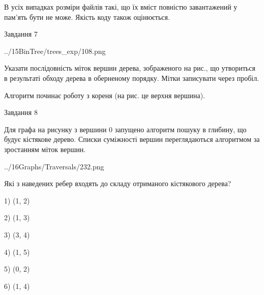 \documentclass[12pt, ukrainian]{article}
\begin{document}
{В усіх випадках розміри файлів такі, що їх вміст повністю завантажений у пам'ять бути не може. Якість коду також оцінюється.



\vspace{10mm}\par

\newpage
\begin{minipage}[t]{9.7cm}
               
{\begin{center}Завдання {7}\end{center}}
\vspace{-4mm}

\begin{center}
	{../15BinTree/trees_exp/108.png}
\end{center}
Указати послідовність міток вершин дерева, зображеного на рис., що утвориться в результаті обходу дерева в оберненому порядку. Мітки записувати через пробіл.\par Алгоритм починає роботу з кореня (на рис. це верхня вершина).\par

\end{minipage}
\vline \hspace{8mm}
\begin{minipage}[t]{8.0cm}
               
{\begin{center}Завдання {8}\end{center}}
\vspace{-4mm}
Для графа на рисунку з вершини 0 запущено алгоритм пошуку в глибину, що будує кістякове дерево. Списки суміжності вершин переглядаються алгоритмом за зростанням міток вершин.\par
\begin{center}
	{../16Graphs/Traversals/232.png}
\end{center}
\par Які з наведених ребер входять до складу отриманого кістякового дерева?\par
1) (1, 2)\par
2) (1, 3)\par
3) (3, 4)\par
4) (1, 5)\par
5) (0, 2)\par
6) (1, 4)\par
{\vskip 15pt} \par


\end{minipage}}
\end{document}
